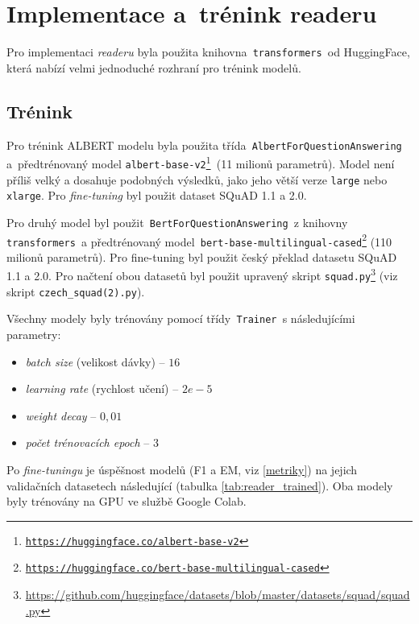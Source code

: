 \section{Implementace a~trénink readeru}
\label{reader_imp}
Pro implementaci \emph{readeru} byla použita knihovna\texttt{ transformers }od HuggingFace, která nabízí velmi jednoduché rozhraní pro trénink modelů.\par

\subsection{Trénink}
Pro trénink ALBERT modelu byla použita třída\texttt{ AlbertForQuestionAnswering }a~předtrénovaný model \texttt{albert-base-v2\footnote{\url{https://huggingface.co/albert-base-v2}} }(11 milionů parametrů). Model není příliš velký a dosahuje podobných výsledků, jako jeho větší verze \texttt{large} nebo \texttt{xlarge}. Pro \emph{fine-tuning} byl použit dataset SQuAD 1.1 a 2.0.\par
Pro druhý model byl použit\texttt{ BertForQuestionAnswering }z knihovny\texttt{ transformers }a předtrénovaný model\texttt{ bert-base-multilingual-cased\footnote{\url{https://huggingface.co/bert-base-multilingual-cased}}} (110 milionů parametrů). Pro fine-tuning byl použit český překlad datasetu SQuAD 1.1 a 2.0. Pro načtení obou datasetů byl použit upravený skript \texttt{squad.py}\footnote{\url{https://github.com/huggingface/datasets/blob/master/datasets/squad/squad.py}} (viz skript \texttt{czech\_squad(2).py}).\par
Všechny modely byly trénovány pomocí třídy\texttt{ Trainer }s následujícími parametry:
\begin{itemize}
    \item \emph{batch size} (velikost dávky) -- $16$
    \item \emph{learning rate} (rychlost učení) -- $2e\!-\!5$
    \item \emph{weight decay} -- $0,01$
    \item \emph{počet trénovacích epoch} -- $3$
\end{itemize}

Po \emph{fine-tuningu} je úspěšnost modelů (F1 a EM, viz \ref{metriky}) na jejich validačních datasetech následující (tabulka \ref{tab:reader_trained}). Oba modely byly trénovány na GPU ve službě Google Colab.

